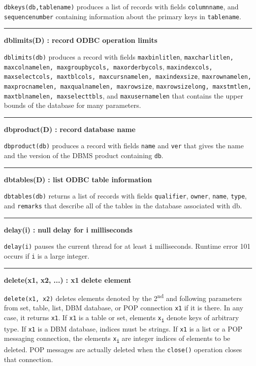 \noindent
{}\texttt{dbkeys(db,tablename)} produces a list of records
with fields \texttt{columnname}, and \texttt{sequencenumber}
containing information about the primary keys in \texttt{tablename}.

\bigskip\hrule\vspace{0.1cm}
\noindent
{\bf dblimits(D) : record } \hfill {\bf ODBC operation limits}

\noindent
\texttt{dblimits(db)} produces a record with fields \texttt{maxbinlitlen},
\texttt{maxcharlitlen, maxcolnamelen, maxgroupbycols, maxorderbycols},
\texttt{maxindexcols, maxselectcols, maxtblcols, maxcursnamelen, maxindexsize},
\texttt{maxrownamelen, maxprocnamelen, maxqualnamelen, maxrowsize},
\texttt{maxrowsizelong, maxstmtlen, maxtblnamelen, maxselecttbls}, and
\texttt{maxusernamelen} that contains the upper bounds of the database
for many parameters.

\bigskip\hrule\vspace{0.1cm}
\noindent
{\bf dbproduct(D) : record } \hfill {\bf database name}

\noindent
\texttt{dbproduct(db)} produces a record with fields \texttt{name}
and \texttt{ver} that gives the name and the
version of the DBMS product containing \texttt{db}.

\bigskip\hrule\vspace{0.1cm}
\noindent
{\bf dbtables(D) : list } \hfill {\bf ODBC table information}

\noindent
\texttt{dbtables(db)} returns a list of records with fields
\texttt{qualifier}, \texttt{owner}, \texttt{name}, \texttt{type}, and
\texttt{remarks} that describe all of the tables in the database
associated with db.

\bigskip\hrule\vspace{0.1cm}
\noindent
{\bf delay(i) : null } \hfill {\bf delay for i milliseconds}

\noindent
{}\texttt{delay(i)} pauses the current thread for at least
\texttt{i} milliseconds. Runtime error 101 occurs if \texttt{i}
is a large integer.

\bigskip\hrule\vspace{0.1cm}
\noindent
{\bf delete(x1, x2, ...) : x1 } \hfill {\bf delete element}\WarningNotThreadSafe

\noindent
{}\texttt{delete(x1, x2)} deletes elements denoted by the
2\textsuperscript{nd} and following parameters from set, table, list,
DBM database, or POP connection \texttt{x1} if it is there. In any case, it
returns \texttt{x1}. If \texttt{x1} is a table or set, elements
\texttt{x\textsubscript{i}} denote
keys of arbitrary type. If \texttt{x1} is a DBM database, indices must be
strings. If \texttt{x1} is a list or a POP messaging connection,
the elements \texttt{x\textsubscript{i}} are
integer indices of elements to be deleted. POP messages are actually
deleted when the \texttt{close()} operation closes that connection.

